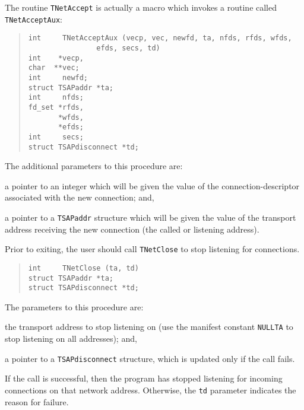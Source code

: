 The routine \verb"TNetAccept" is actually a macro which invokes a routine
called \verb"TNetAcceptAux":
\begin{quote}\small\begin{verbatim}
int     TNetAcceptAux (vecp, vec, newfd, ta, nfds, rfds, wfds,
                efds, secs, td)
int    *vecp,
char  **vec;
int     newfd;
struct TSAPaddr *ta;
int     nfds;
fd_set *rfds,
       *wfds,
       *efds;
int     secs;
struct TSAPdisconnect *td;
\end{verbatim}\end{quote}
The additional parameters to this procedure are:
\begin{describe}
\item[\verb"newfd":] a pointer to an integer which will be given the value of
the connection-descriptor associated with the new connection;
and,

\item[\verb"ta":] a pointer to a \verb"TSAPaddr" structure which will be given
the value of the transport address receiving the new connection
(the called or listening address).
\end{describe}

Prior to exiting,
the user should call \verb"TNetClose" to stop listening for connections.
\begin{quote}\small\begin{verbatim}
int     TNetClose (ta, td)
struct TSAPaddr *ta;
struct TSAPdisconnect *td;
\end{verbatim}\end{quote}
The parameters to this procedure are:
\begin{describe}
\item[\verb"ta":] the transport address to stop listening on
(use the manifest constant \verb"NULLTA" to stop listening on all addresses);
and,

\item[\verb"td":] a pointer to a \verb"TSAPdisconnect" structure,
which is updated only if the call fails.
\end{describe}
If the call is successful,
then the program has stopped listening for incoming connections on that network
address.
Otherwise,
the \verb"td" parameter indicates the reason for failure.

